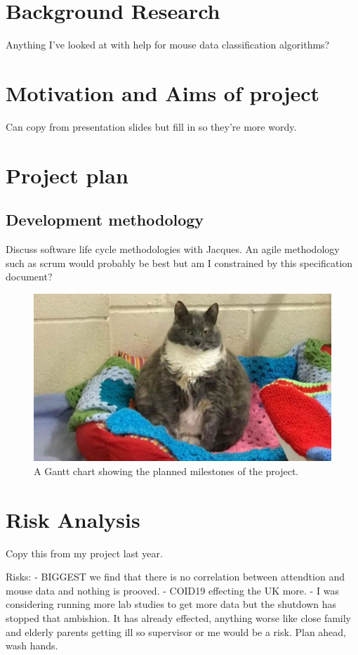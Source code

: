 \documentclass{article}
\begin{document}
\section{Background Research}
Anything I've looked at with help for mouse data classification algorithms? 


\section{Motivation and Aims of project}
Can copy from presentation slides but fill in so they're more wordy.


\section{Project plan}

\subsection{Development methodology}
Discuss software life cycle methodologies with Jacques.
An agile methodology such as scrum would probably be best but am I constrained  by this specification document?

\begin{figure}[ht]
    \centering
    \includegraphics[scale=0.35]{Test.JPG}
    \caption{A Gantt chart showing the planned milestones of the project.}
    \label{fig:Gantt}
\end{figure}

\section{Risk Analysis}
Copy this from my project last year.

Risks: 
- BIGGEST we find that there is no correlation between attendtion and mouse data and nothing is prooved.
- COID19 effecting the UK more. - I was considering running more lab studies to get more data but the shutdown has stopped that ambishion.
    It has already effected, anything worse like close family and elderly parents getting ill so supervisor or me would be a risk.
    Plan ahead, wash hands.


\printbibliography
\end{document}

